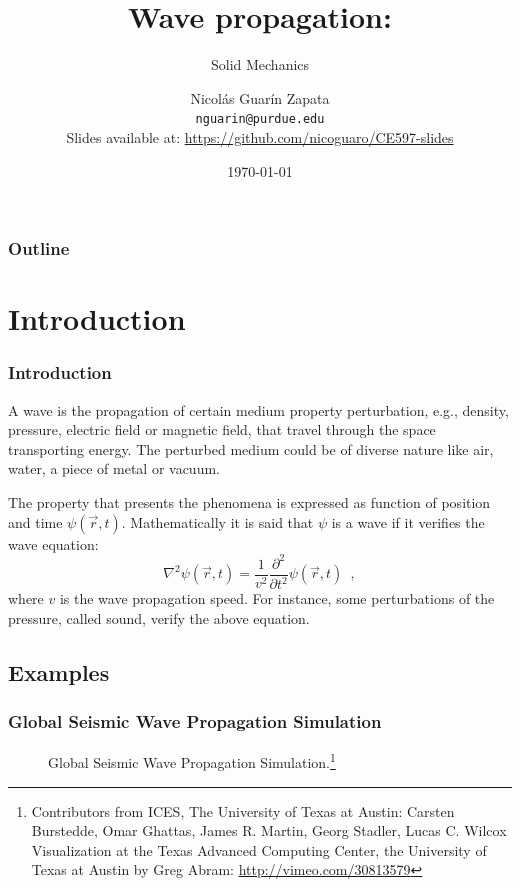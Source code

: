 \documentclass{beamer}
\begin{document}
\title[Wave propagation in solids] %
{Wave propagation:}
\subtitle{Solid Mechanics}
\author[Guarin-Zapata, Nicolas] %
{Nicol\'as Guar\'in Zapata\\ \texttt{\small nguarin@purdue.edu}\\
{\tiny Slides available at: \url{https://github.com/nicoguaro/CE597-slides}}}
\date{\today}
\subject{Wave propagation}

\frame{\titlepage}

\begin{frame}
	\frametitle{Outline}
	\tableofcontents
\end{frame}
%


\section{Introduction}
\begin{frame}
\frametitle{Introduction}
A wave is the propagation of certain medium property perturbation, e.g., density, pressure, electric field or magnetic field, that travel through the space transporting energy. The perturbed medium could be of diverse nature like air, water, a piece of metal or vacuum.

The property that presents the phenomena is expressed as function of position and time $\psi(\vec{r},t)$. Mathematically  it is said that $\psi$ is a wave if it verifies the wave equation:
\[\nabla^2 \psi(\vec{r},t)= \frac{1}{v^2} \frac{\partial^2 }{\partial t^2}\psi(\vec{r},t) \enspace ,\]
where $v$ is the wave propagation speed. For instance, some perturbations of the pressure, called sound, verify the above equation.
\end{frame}

\subsection{Examples}
\begin{frame}\frametitle{Global Seismic Wave Propagation Simulation}
\begin{figure}[H]
\centering
{}
\caption{Global Seismic Wave Propagation Simulation.\footnote{Contributors from ICES, The University of Texas at Austin: Carsten Burstedde, Omar Ghattas, James R. Martin, Georg Stadler, Lucas C. Wilcox Visualization at the Texas Advanced Computing Center, the University of Texas at Austin by Greg Abram: \url{http://vimeo.com/30813579}}}
\label{vid:global}
\end{figure}
\end{frame}
\end{document}

